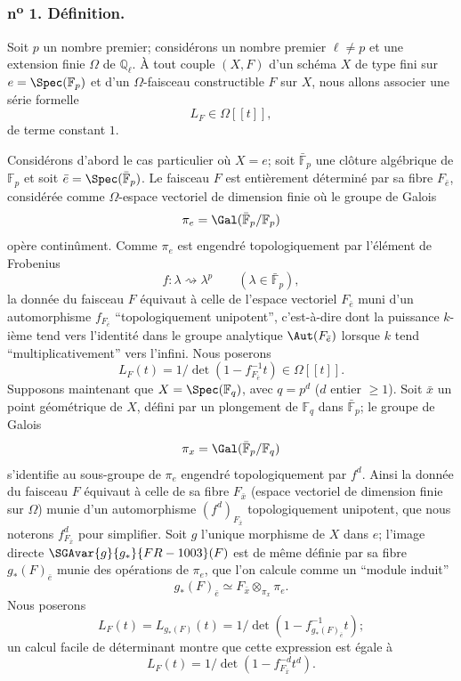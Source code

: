 \subsubsection*{n\textsuperscript{o} 1. Définition.}

Soit $p$ un nombre premier; considérons un nombre premier $\ell\ne p$ et une extension finie $\Omega$ de $\mathbb{Q}_\ell$. À tout couple $(X,F)$ d'un schéma $X$ de type fini sur $e=\Spec(\mathbb{F}_p)$ et d'un $\Omega$-faisceau constructible $F$ sur $X$, nous allons associer une série formelle
\[
L_F\in\Omega[[t]],
\]
de terme constant $1$.


Considérons d'abord le cas particulier où $X=e$; soit $\bar{\mathbb{F}}_p$ une clôture algébrique de $\mathbb{F}_p$ et soit $\bar e=\Spec(\bar{\mathbb{F}}_p)$. Le faisceau $F$ est entièrement déterminé par sa fibre $F_{\bar e}$, considérée comme $\Omega$-espace vectoriel de dimension finie où le groupe de Galois
\[
\pi_e=\Gal(\bar{\mathbb{F}}_p/\mathbb{F}_p)
\]
opère continûment. Comme $\pi_e$ est engendré topologiquement par l'élément de Frobenius
\[
f: \lambda\rightsquigarrow \lambda^p\qquad(\lambda\in\bar{\mathbb{F}}_p),
\]
la donnée du faisceau $F$ équivaut à celle de l'espace vectoriel $F_{\bar e}$ muni d'un automorphisme $f_{F_{\bar e}}$ ``topologiquement unipotent'', c'est-à-dire dont la puissance $k$-ième tend vers l'identité dans le groupe analytique $\Aut(F_{\bar e})$ lorsque $k$ tend ``multiplicativement'' vers l'infini. Nous poserons
\[
L_F(t)=1/\det(1-f_{F_{\bar e}}^{-1}t)\in\Omega[[t]].
\]
Supposons maintenant que $X=\Spec(\mathbb{F}_q)$, avec $q=p^d$ ($d$ entier $\ge1$). Soit $\bar x$ un point géométrique de $X$, défini par un plongement de $\mathbb{F}_q$ dans $\bar{\mathbb{F}}_p$; le groupe de Galois
\[
\pi_x=\Gal(\bar{\mathbb{F}}_p/\mathbb{F}_q)
\]
s'identifie au sous-groupe de $\pi_e$ engendré topologiquement par $f^d$. Ainsi la donnée du faisceau $F$ équivaut à celle de sa fibre $F_{\bar x}$ (espace vectoriel de dimension finie sur $\Omega$) munie d'un automorphisme $(f^d)_{F_{\bar x}}$ topologiquement unipotent, que nous noterons $f^d_{F_{\bar x}}$ pour simplifier. Soit $g$ l'unique morphisme de $X$ dans $e$; l'image directe $\SGAvar{g}{g_*}{FR-1003}(F)$ est de même définie par sa fibre $g_*(F)_{\bar e}$ munie des opérations de $\pi_e$, que l'on calcule comme un ``module induit''
\[
g_*(F)_{\bar e}\simeq F_{\bar x}\otimes_{\pi_x}\pi_e.
\]
Nous poserons
\[
L_F(t)=L_{g_*(F)}(t)=1/\det(1-f^{-1}_{g_*(F)_{\bar e}}t);
\]
un calcul facile de déterminant montre que cette expression est égale 
à
\[
L_F(t)=1/\det(1-f^{-d}_{F_{\bar x}}t^d).
\]

